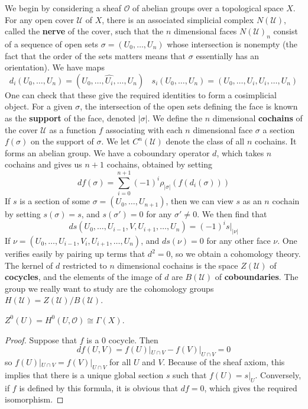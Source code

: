 We begin by considering a sheaf $\mathcal{O}$ of abelian groups over a topological space $X$. For any open cover $\mathcal{U}$ of $X$, there is an associated simplicial complex $N(\mathcal{U})$, called the {\bf nerve} of the cover, such that the $n$ dimensional faces $N(\mathcal{U})_n$ consist of a sequence of open sets $\sigma = (U_0, \dots, U_n)$ whose intersection is nonempty (the fact that the order of the sets matters means that $\sigma$ essentially has an orientation). We have maps
%
\[ d_i(U_0, \dots, U_n) = (U_0, \dots, \widehat{U_i}, \dots, U_n)\ \ \ \ s_i(U_0, \dots, U_n) = (U_0, \dots, U_i, U_i, \dots, U_n) \]
%
One can check that these give the required identities to form a cosimplicial object. For a given $\sigma$, the intersection of the open sets defining the face is known as the {\bf support} of the face, denoted $|\sigma|$. We define the $n$ dimensional {\bf cochains} of the cover $\mathcal{U}$ as a function $f$ associating with each $n$ dimensional face $\sigma$ a section $f(\sigma)$ on the support of $\sigma$. We let $C^n(\mathcal{U})$ denote the class of all $n$ cochains. It forms an abelian group. We have a coboundary operator $d$, which takes $n$ cochains and gives us $n+1$ cochains, obtained by setting
%
\[ df(\sigma) = \sum_{i = 0}^{n+1} (-1)^i \rho_{|\sigma|}(f(d_i(\sigma))) \]
%
If $s$ is a section of some $\sigma = (U_0, \dots, U_{n+1})$, then we can view $s$ as an $n$ cochain by setting $s(\sigma) = s$, and $s(\sigma') = 0$ for any $\sigma' \neq 0$. We then find that
%
\[ ds(U_0, \dots, U_{i-1}, V, U_{i+1}, \dots, U_n) = (-1)^i s|_{|\nu|} \]
%
If $\nu = (U_0, \dots, U_{i-1}, V_i, U_{i+1}, \dots, U_n)$, and $ds(\nu) = 0$ for any other face $\nu$. One verifies easily by pairing up terms that $d^2 = 0$, so we obtain a cohomology theory. The kernel of $d$ restricted to $n$ dimensional cochains is the space $Z(\mathcal{U})$ of {\bf cocycles}, and the elements of the image of $d$ are $B(\mathcal{U})$ of {\bf coboundaries}. The group we really want to study are the cohomology groups $H(\mathcal{U}) = Z(\mathcal{U})/B(\mathcal{U})$.

\begin{lemma}
    $Z^0(U) = H^0(U,\mathcal{O}) \cong \Gamma(X)$.
\end{lemma}
\begin{proof}
    Suppose that $f$ is a 0 cocycle. Then
    \[ df(U,V) = f(U)|_{U \cap V} - f(V)|_{U \cap V} = 0 \]
    so $f(U)|_{U \cap V} = f(V)|_{U \cap V}$ for all $U$ and $V$. Because of the sheaf axiom, this implies that there is a unique global section $s$ such that $f(U) = s|_U$. Conversely, if $f$ is defined by this formula, it is obvious that $df = 0$, which gives the required isomorphism.
\end{proof}


